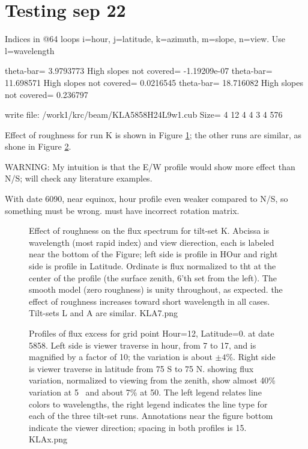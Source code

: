 \documentclass{article}
\begin{document}

\section{Testing sep 22}
 Indices in @64 loops i=hour, j=latitude, k=azimuth, m=slope, n=view.
 Use l=wavelength



theta-bar=       3.9793773 High slopes not covered= -1.19209e-07
theta-bar=       11.698571 High slopes not covered=    0.0216545
theta-bar=       18.716082 High slopes not covered=     0.236797

write  file: /work1/krc/beam/KLA5858H24L9w1.cub Size=  4 12 4 4 3 4 576

Effect of roughness for run K is shown in Figure \ref{KLA7}; the other runs are
similar, as shone in Figure \ref{KLAx}.

WARNING: My intuition is that the E/W profile would show more effect than N/S;
will check any literature examples.

With date 6090, near equinox, hour profile even weaker compared to N/S,
 so something must be wrong. must have incorrect rotation matrix.

\begin{figure}[!ht] 
\caption[Effect of roughness]{Effect of roughness on the flux spectrum for
  tilt-set K. Abcissa is wavelength (most rapid index) and view dierection, each
  is labeled near the bottom of the Figure; left side is profile in HOur and
  right side is profile in Latitude. Ordinate is flux normalized to tht at the
  center of the profile (the surface zenith, 6'th set from the left). The smooth
  model (zero roughness) is unity throughout, as expected. the effect of
  roughness increases toward short wavelength in all cases. Tilt-sets L and A
  are similar.
\label{KLA7} KLA7.png  }
\end{figure} 

\begin{figure}[!ht] 
\caption[Flux profiles]{Profiles of flux excess for grid point Hour=12,
  Latitude=0. at date 5858. Left side is viewer traverse in hour, from 7 to 17,
  and is magnified by a factor of 10; the variation is about $\pm 4$\%.  Right
  side is viewer traverse in latitude from 75 S to 75 N. showing flux variation,
  normalized to viewing from the zenith, show almost 40\% variation at 5\um~ and
  about 7\% at 50\um. The left legend relates line colors to wavelengths, the
  right legend indicates the line type for each of the three tilt-set
  runs. Annotations near the figure bottom indicate the viewer direction;
  spacing in both profiles is 15\qd.
\label{KLAx}  KLAx.png  }
\end{figure} 
\end{document}
